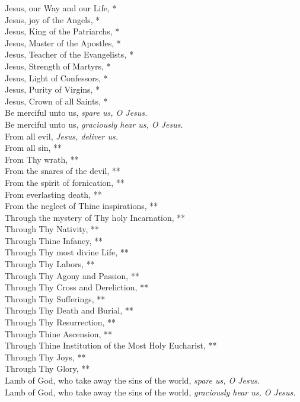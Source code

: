 \documentclass{article}
\begin{document}
\begin{multicols}{3}
Jesus, our Way and our Life, *\\
Jesus, joy of the Angels, *\\
Jesus, King of the Patriarchs, *\\
Jesus, Master of the Apostles, *\\
Jesus, Teacher of the Evangelists, *\\
Jesus, Strength of Martyrs, *\\
Jesus, Light of Confessors, *\\
Jesus, Purity of Virgins, *\\
Jesus, Crown of all Saints, *\\
Be merciful unto us, \textit{spare us, O Jesus.}\\
Be merciful unto us, \textit{graciously hear us, O Jesus.}\\
From all evil, \textit{Jesus, deliver us.}\\
From all sin, **\\
From Thy wrath, **\\
From the snares of the devil, **\\
From the spirit of fornication, **\\
From everlasting death, **\\
From the neglect of Thine inspirations, **\\
Through the mystery of Thy holy Incarnation, **\\
Through Thy Nativity, **\\
Through Thine Infancy, **\\
Through Thy most divine Life, **\\
Through Thy Labors, **\\
Through Thy Agony and Passion, **\\
Through Thy Cross and Dereliction, **\\
Through Thy Sufferings, **\\
Through Thy Death and Burial, **\\
Through Thy Resurrection, **\\
Through Thine Ascension, **\\
Through Thine Institution of the Most Holy Eucharist, **\\
Through Thy Joys, **\\
Through Thy Glory, **\\
Lamb of God, who take away the sins of the world, \textit{spare us, O Jesus.}\\
Lamb of God, who take away the sins of the world, \textit{graciously hear us, O Jesus.}\\

\end{multicols}
\end{document}
